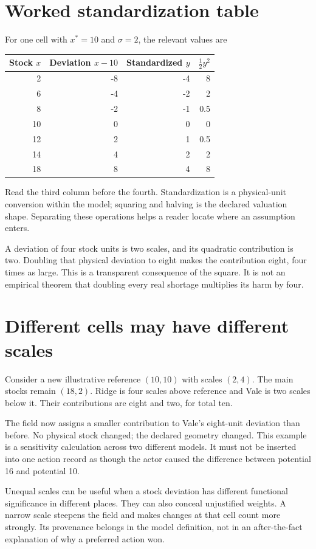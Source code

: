 \section{Worked standardization table}
For one cell with \(x^*=10\) and \(\sigma=2\), the relevant values are
\begin{center}
\begin{tabular}{rrrr}
\toprule
Stock \(x\) & Deviation \(x-10\) & Standardized \(y\) & \(\tfrac12 y^2\)\\
\midrule
2 & -8 & -4 & 8\\
6 & -4 & -2 & 2\\
8 & -2 & -1 & 0.5\\
10 & 0 & 0 & 0\\
12 & 2 & 1 & 0.5\\
14 & 4 & 2 & 2\\
18 & 8 & 4 & 8\\
\bottomrule
\end{tabular}
\end{center}
Read the third column before the fourth. Standardization is a physical-unit conversion within the model; squaring and halving is the declared valuation shape. Separating these operations helps a reader locate where an assumption enters.

A deviation of four stock units is two scales, and its quadratic contribution is two. Doubling that physical deviation to eight makes the contribution eight, four times as large. This is a transparent consequence of the square. It is not an empirical theorem that doubling every real shortage multiplies its harm by four.

\section{Different cells may have different scales}
Consider a new illustrative reference \((10,10)\) with scales \((2,4)\). The main stocks remain \((18,2)\). Ridge is four scales above reference and Vale is two scales below it. Their contributions are eight and two, for total ten.

The field now assigns a smaller contribution to Vale's eight-unit deviation than before. No physical stock changed; the declared geometry changed. This example is a sensitivity calculation across two different models. It must not be inserted into one action record as though the actor caused the difference between potential 16 and potential 10.

Unequal scales can be useful when a stock deviation has different functional significance in different places. They can also conceal unjustified weights. A narrow scale steepens the field and makes changes at that cell count more strongly. Its provenance belongs in the model definition, not in an after-the-fact explanation of why a preferred action won.

